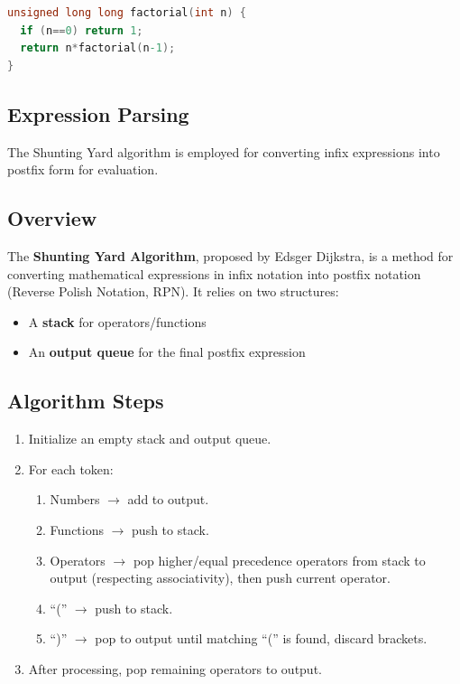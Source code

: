 \documentclass[conference]{IEEEtran}
\begin{document}
\begin{lstlisting}[language=C, caption={C Implementation of Factorial Function}]
unsigned long long factorial(int n) {
  if (n==0) return 1;
  return n*factorial(n-1);
}
\end{lstlisting}

\subsection{Expression Parsing}

The Shunting Yard algorithm is employed for converting infix expressions into postfix form for evaluation.

\subsection{Overview}
The \textbf{Shunting Yard Algorithm}, proposed by Edsger Dijkstra, is a method for converting mathematical expressions in infix notation into postfix notation (Reverse Polish Notation, RPN).  
It relies on two structures:
\begin{itemize}
    \item A \textbf{stack} for operators/functions
    \item An \textbf{output queue} for the final postfix expression
\end{itemize}

\subsection{Algorithm Steps}
\begin{enumerate}
    \item Initialize an empty stack and output queue.
    \item For each token:
    \begin{enumerate}
        \item Numbers $\rightarrow$ add to output.
        \item Functions $\rightarrow$ push to stack.
        \item Operators $\rightarrow$ pop higher/equal precedence operators from stack to output (respecting associativity), then push current operator.
        \item ``('' $\rightarrow$ push to stack.
        \item ``)'' $\rightarrow$ pop to output until matching ``('' is found, discard brackets.
    \end{enumerate}
    \item After processing, pop remaining operators to output.
\end{enumerate}
\end{document}
